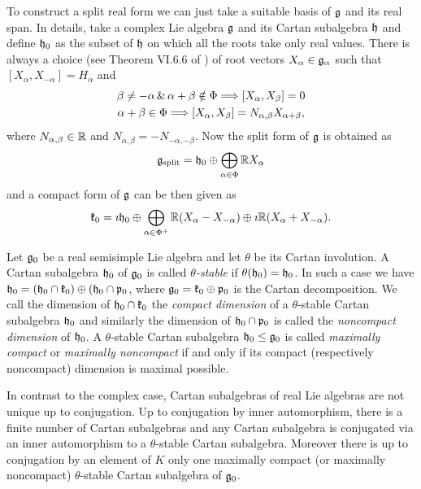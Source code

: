 To construct a split real form we can just take a suitable basis of $\mathfrak{g}$ and its real span. In details, take a complex Lie algebra $\mathfrak{g}$ and its Cartan subalgebra $\mathfrak{h}$ and define $\mathfrak{h}_0$ as the subset of $\mathfrak{h}$ on which all the roots take only real values. There is always a choice (see Theorem VI.6.6 of \cite{knapp_advanced}) of root vectors $X_\alpha \in \mathfrak{g}_\alpha$ such that $[X_\alpha, X_{-\alpha}] = H_\alpha$ and
\begin{gather*}
\beta \neq -\alpha \,\&\, \alpha + \beta \notin \Phi \Longrightarrow [X_\alpha,X_\beta]=0 \\
 \alpha + \beta \in\Phi \Longrightarrow [X_\alpha, X_\beta] = N_{\alpha,\beta}X_{\alpha+\beta},
\end{gather*}
where $N_{\alpha,\beta}\in\mathbb{R}$ and $N_{\alpha,\beta} = -N_{-\alpha,-\beta}$. Now the split form of $\mathfrak{g}$ is obtained as
\[
 \mathfrak{g}_\text{split} = \mathfrak{h}_0 \oplus \bigoplus_{\alpha \in\Phi} \mathbb{R} X_\alpha
\]
and a compact form of $\mathfrak{g}$ can be then given as
\[
 \mathfrak{k}_0 = \imath \mathfrak{h}_0 \oplus \bigoplus_{\alpha\in\Phi^+} \mathbb{R} (X_\alpha - X_{-\alpha}) \oplus \imath \mathbb{R} (X_\alpha + X_{-\alpha}).
\]

Let $\mathfrak{g}_0$ be a real semisimple Lie algebra and let $\theta$ be its Cartan involution. A Cartan subalgebra $\mathfrak{h}_0$ of $\mathfrak{g}_0$ is called \emph{$\theta$-stable} if $\theta(\mathfrak{h}_0)=\mathfrak{h}_0$. In such a case we have $\mathfrak{h}_0= (\mathfrak{h}_0\cap\mathfrak{k}_0) \oplus (\mathfrak{h}_0\cap\mathfrak{p}_0$, where $\mathfrak{g}_0 = \mathfrak{k}_0\oplus\mathfrak{p}_0$ is the Cartan decomposition. We call the dimension of $\mathfrak{h}_0\cap\mathfrak{k}_0$ the \emph{compact dimension} of a $\theta$-stable  Cartan subalgebra $\mathfrak{h}_0$ and similarly the dimension of $\mathfrak{h}_0\cap\mathfrak{p}_0$ is called the \emph{noncompact dimension} of $\mathfrak{h}_0$. A $\theta$-stable Cartan subalgebra $\mathfrak{h}_0 \leq \mathfrak{g}_0$ is called \emph{maximally compact} or \emph{maximally noncompact} if and only if its compact (respectively noncompact) dimension is maximal possible.


In contrast to the complex case, Cartan subalgebras of real Lie algebras are not unique up to conjugation. Up to conjugation by inner automorphism, there is a finite number of Cartan subalgebras and any Cartan subalgebra is conjugated via an inner automorphism to a $\theta$-stable Cartan subalgebra. Moreover there is up to conjugation by an element of $K$ only one maximally compact (or maximally noncompact) $\theta$-stable Cartan subalgebra of $\mathfrak{g}_0$.

